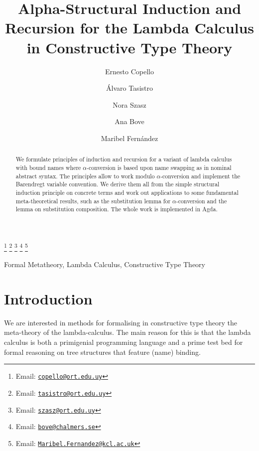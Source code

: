 \documentclass{entcs}
\newcommand{\alp}{\ensuremath{\alpha}}
\begin{document}
\begin{frontmatter}
 \title{Alpha-Structural Induction and Recursion for the Lambda Calculus in Constructive Type Theory}
  \author{Ernesto Copello }
  \author{\'Alvaro Tasistro }
  \author{Nora Szasz }
  \address{Universidad ORT Uruguay\\
      Montevideo, Uruguay}
\author{Ana Bove }
  \address{Chalmers University of Technology\\
    Gothenburg, Sweden}
  \author{Maribel Fern\'andez }
  \address{King's College London\\
      London, England}
  \thanks[emailC]{Email: \href{mailto:copello@ort.edu.uy} {\texttt{\normalshape copello@ort.edu.uy}}}
  \thanks[emailT]{Email: \href{mailto:tasistro@ort.edu.uy} {\texttt{\normalshape tasistro@ort.edu.uy}}} 
  \thanks[emailS]{Email: \href{mailto:szasz@ort.edu.uy} {\texttt{\normalshape szasz@ort.edu.uy}}}
    \thanks[emailB]{Email: \href{mailto:bove@chalmers.se} {\texttt{\normalshape bove@chalmers.se}}}
  \thanks[emailF]{Email: \href{mailto:Maribel.Fernandez@kcl.ac.uk} {\texttt{\normalshape Maribel.Fernandez@kcl.ac.uk}}}

\begin{abstract} 
We formulate principles of induction and recursion for a variant of lambda calculus with bound names where \alp-conversion is based upon name swapping as in nominal abstract syntax. The principles allow to work modulo $\alpha$-conversion and implement the Barendregt variable convention. We derive them all from the simple structural induction principle on concrete terms and work out applications to some fundamental meta-theoretical results, such as the substitution lemma for $\alpha$-conversion and the lemma on substitution composition. The whole work is implemented in Agda.
\end{abstract}

\begin{keyword}
Formal Metatheory, Lambda Calculus, Constructive Type Theory
\end{keyword}

\end{frontmatter}

\maketitle

\section{Introduction}
\label{sec:intro}
We are interested in methods for formalising in constructive type theory the meta-theory of the lambda-calculus. The main reason for this is that the lambda calculus is both a primigenial programming language and a prime test bed
for formal reasoning on tree structures that feature (name) binding. 
\end{document}
